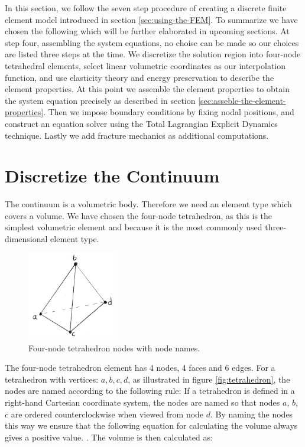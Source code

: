 

\label{sec:applying-fem}
In this section, we follow the seven step procedure of creating a
discrete finite element model introduced in section
\vref{sec:using-the-FEM}.
%
To summarize we have chosen the following which will be further
elaborated in upcoming sections. At step four, assembling the system
equations, no choise can be made so our choices are listed three steps
at the time.
%
We discretize the solution region into four-node tetrahedral elements,
select linear volumetric coordinates as our interpolation
function, and use elasticity theory and energy preservation to
describe the element properties.
%
At this point we assemble the element properties to obtain the system
equation precisely as described in section
\vref{sec:asseble-the-element-properties}.
%
Then we impose boundary conditions by fixing nodal positions, and
construct an equation solver using the Total Lagrangian Explicit
Dynamics technique. Lastly we add fracture mechanics as additional
computations.

\section{Discretize the Continuum}
The continuum is a volumetric body. Therefore we need an element type
which covers a volume. We have chosen the four-node tetrahedron, as this
is the simplest volumetric element and because it is the most commonly
used three-dimensional element type.

\begin{figure}
  \centering
  \includegraphics[width=4cm]{./images/finite_element_method_tetrahedron.png}
\caption{Four-node tetrahedron nodes with node names.}
\label{fig:tetrahedron}
\end{figure}

The four-node tetrahedron element has 4 nodes, 4 faces and 6 edges.
For a tetrahedron with vertices: $a,b,c,d$, as illustrated in figure
\vref{fig:tetrahedron}, the nodes are named according to the following
rule: If a tetrahedron is defined in a right-hand
Cartesian coordinate system, the nodes are named so that nodes $a$,
$b$, $c$ are ordered counterclockwise when viewed from node $d$. By
naming the nodes this way we ensure that the following equation for
calculating the volume always gives a positive value.
.
%
The volume is then calculated as:

